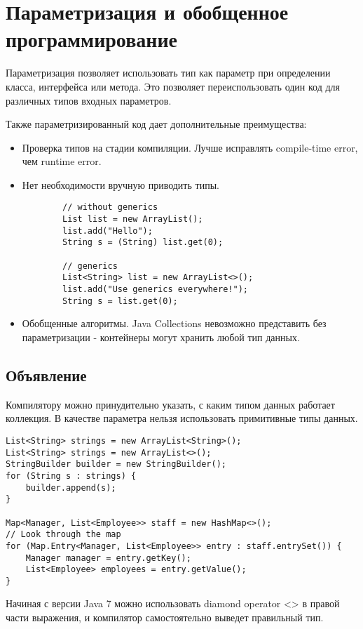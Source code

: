 \documentclass[a4paper,12pt]{extreport}
\begin{document}
\section{Параметризация и обобщенное программирование}
Параметризация позволяет использовать тип как параметр при определении класса, интерфейса или метода. Это позволяет переиспользовать один код для различных типов входных параметров.

Также параметризированный код дает дополнительные преимущества:
\begin {itemize}
    \item Проверка типов на стадии компиляции. Лучше исправлять compile-time error, чем runtime error.
    \item Нет необходимости вручную приводить типы.
        \begin{lstlisting}
        // without generics
        List list = new ArrayList();
        list.add("Hello");
        String s = (String) list.get(0);
        
        // generics
        List<String> list = new ArrayList<>();
        list.add("Use generics everywhere!");
        String s = list.get(0);
        \end{lstlisting}
    \item Обобщенные алгоритмы. Java Collections невозможно представить без параметризации - контейнеры могут хранить любой тип данных.
\end{itemize}

\subsection*{Объявление}
Компилятору можно принудительно указать, с каким типом данных работает коллекция. В качестве параметра нельзя использовать примитивные типы данных. 
\begin{lstlisting}
List<String> strings = new ArrayList<String>();
List<String> strings = new ArrayList<>(); 
StringBuilder builder = new StringBuilder();
for (String s : strings) {
    builder.append(s);
}

Map<Manager, List<Employee>> staff = new HashMap<>();
// Look through the map
for (Map.Entry<Manager, List<Employee>> entry : staff.entrySet()) {
    Manager manager = entry.getKey();
    List<Employee> employees = entry.getValue();
}
\end{lstlisting}

Начиная с версии Java 7 можно использовать diamond operator <> в правой части выражения, и компилятор самостоятельно выведет правильный тип.
\end{document}
